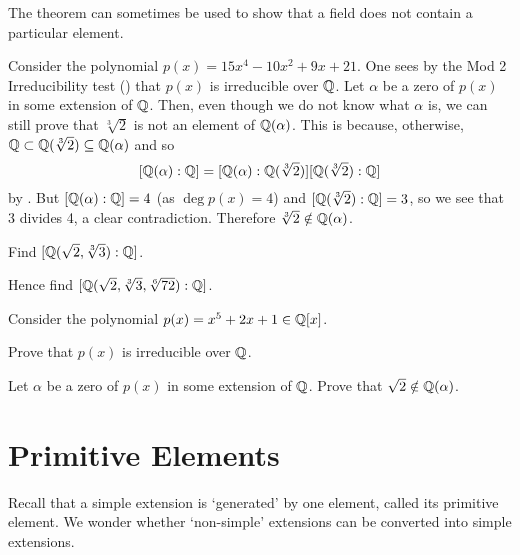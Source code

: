 The theorem can sometimes be used to show that a field does not contain a particular element.

\begin{example}
    Consider the polynomial $p(x) = 15x^4 - 10x^2 + 9x + 21$. One sees by the Mod 2 Irreducibility test () that $p(x)$ is irreducible over $\mathbb{Q}$. Let $\alpha$ be a zero of $p(x)$ in some extension of $\mathbb{Q}$. Then, even though we do not know what $\alpha$ is, we can still prove that $\sqrt[3]2$ is not an element of $\mathbb{Q}(\alpha)$. This is because, otherwise, $\mathbb{Q} \subset \mathbb{Q}(\sqrt[3]2) \subseteq \mathbb{Q}(\alpha)$ and so
    \[
        [\mathbb{Q}(\alpha):\mathbb{Q}] = [\mathbb{Q}(\alpha):\mathbb{Q}(\sqrt[3]2)][\mathbb{Q}(\sqrt[3]2):\mathbb{Q}]
    \]
    by . But $[\mathbb{Q}(\alpha):\mathbb{Q}] = 4$ (as $\deg p(x) = 4$) and $[\mathbb{Q}(\sqrt[3]2):\mathbb{Q}] = 3$, so we see that 3 divides 4, a clear contradiction. Therefore $\sqrt[3]2 \notin \mathbb{Q}(\alpha)$.
\end{example}

\begin{exercise}
    \hfill
    \begin{partquestions}{\alph*}
        \item \begin{partquestions}{\roman*}
            \item Find $[\mathbb{Q}(\sqrt2,\sqrt[3]3):\mathbb{Q}]$.
            \item Hence find $[\mathbb{Q}(\sqrt2, \sqrt[3]3, \sqrt[6]{72}):\mathbb{Q}]$.
        \end{partquestions}
        \item Consider the polynomial $p(x) = x^5 + 2x + 1 \in \mathbb{Q}[x]$.
        \begin{partquestions}{\roman*}
            \item Prove that $p(x)$ is irreducible over $\mathbb{Q}$.
            \item Let $\alpha$ be a zero of $p(x)$ in some extension of $\mathbb{Q}$. Prove that $\sqrt2 \notin \mathbb{Q}(\alpha)$.
        \end{partquestions}
    \end{partquestions}
\end{exercise}

\section{Primitive Elements}
Recall that a simple extension is `generated' by one element, called its primitive element. We wonder whether `non-simple' extensions can be converted into simple extensions.

